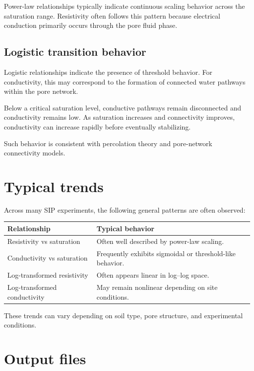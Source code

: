 \documentclass[11pt]{article}
\begin{document}
Power-law relationships typically indicate continuous scaling behavior across the saturation range. Resistivity often follows this pattern because electrical conduction primarily occurs through the pore fluid phase.

\subsection{Logistic transition behavior}

Logistic relationships indicate the presence of threshold behavior. For conductivity, this may correspond to the formation of connected water pathways within the pore network.

Below a critical saturation level, conductive pathways remain disconnected and conductivity remains low. As saturation increases and connectivity improves, conductivity can increase rapidly before eventually stabilizing.

Such behavior is consistent with percolation theory and pore-network connectivity models.

\section{Typical trends}

Across many SIP experiments, the following general patterns are often observed:

\begin{longtable}{p{} p{}}
\toprule
\textbf{Relationship} & \textbf{Typical behavior}\\
\midrule
\endhead
Resistivity vs saturation & Often well described by power-law scaling.\\
Conductivity vs saturation & Frequently exhibits sigmoidal or threshold-like behavior.\\
Log-transformed resistivity & Often appears linear in log–log space.\\
Log-transformed conductivity & May remain nonlinear depending on site conditions.\\
\bottomrule
\end{longtable}

These trends can vary depending on soil type, pore structure, and experimental conditions.

\section{Output files}
\end{document}
